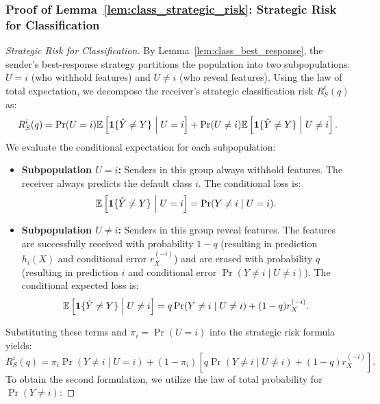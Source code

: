 \subsubsection*{Proof of Lemma~\ref{lem:class_strategic_risk}: Strategic Risk for Classification}
\label{app:proof_class_strategic_risk}
\begin{proof}[Strategic Risk for Classification]
By Lemma~\ref{lem:class_best_response}, the sender's best-response strategy partitions the population into two subpopulations: $U = i$ (who withhold features) and $U \ne i$ (who reveal features). Using the law of total expectation, we decompose the receiver's strategic classification risk $R^i_S(q)$ as:
\begin{equation}
    R^i_S(q) = \Pr(U = i) \mathbb{E}\left[ \mathbf{1}\{\hat{Y} \ne Y\} \;\middle|\; U = i \right] + \Pr(U \ne i) \mathbb{E}\left[ \mathbf{1}\{\hat{Y} \ne Y\} \;\middle|\; U \ne i \right].
\end{equation}
We evaluate the conditional expectation for each subpopulation:
\begin{itemize}
    \item \textbf{Subpopulation $U = i$:} Senders in this group always withhold features. The receiver always predicts the default class $i$. The conditional loss is:
    \begin{equation}
        \mathbb{E}\left[ \mathbf{1}\{\hat{Y} \ne Y\} \;\middle|\; U = i \right] = \Pr(Y \ne i \mid U = i).
    \end{equation}
    \item \textbf{Subpopulation $U \ne i$:} Senders in this group reveal features. The features are successfully received with probability $1 - q$ (resulting in prediction $h_i(X)$ and conditional error $r^{(-i)}_X$) and are erased with probability $q$ (resulting in prediction $i$ and conditional error $\Pr(Y \ne i \mid U \ne i)$). The conditional expected loss is:
    \begin{equation}
        \mathbb{E}\left[ \mathbf{1}\{\hat{Y} \ne Y\} \;\middle|\; U \ne i \right] = q\Pr(Y \ne i \mid U \ne i) + (1 - q)r^{(-i)}_X.
    \end{equation}
\end{itemize}
Substituting these terms and $\pi_i = \Pr(U = i)$ into the strategic risk formula yields:
\begin{equation}
    \label{eq:class_risk_deriv_intermediate}
    R^i_S(q) = \pi_i \Pr(Y \ne i \mid U = i) + (1 - \pi_i) \left[ q \Pr(Y \ne i \mid U \ne i) + (1 - q)r^{(-i)}_X \right].
\end{equation}
To obtain the second formulation, we utilize the law of total probability for $\Pr(Y \ne i)$:

\end{proof}
